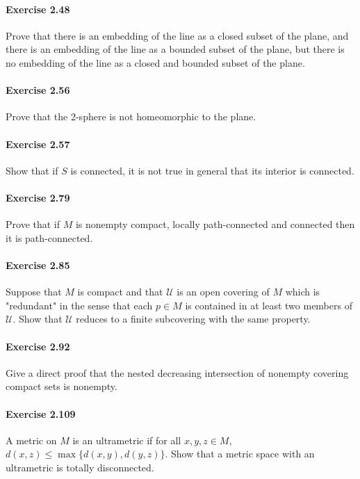 \documentclass{article}
\begin{document}
\paragraph{Exercise 2.48} Prove that there is an embedding of the line as a closed subset of the plane, and there is an embedding of the line as a bounded subset of the plane, but there is no embedding of the line as a closed and bounded subset of the plane.

\paragraph{Exercise 2.56} Prove that the 2-sphere is not homeomorphic to the plane.

\paragraph{Exercise 2.57} Show that if $S$ is connected, it is not true in general that its interior is connected.

\paragraph{Exercise 2.79} Prove that if $M$ is nonempty compact, locally path-connected and connected then it is path-connected.

\paragraph{Exercise 2.85} Suppose that $M$ is compact and that $\mathcal{U}$ is an open covering of $M$ which is "redundant" in the sense that each $p \in M$ is contained in at least two members of $\mathcal{U}$. Show that $\mathcal{U}$ reduces to a finite subcovering with the same property.

\paragraph{Exercise 2.92} Give a direct proof that the nested decreasing intersection of nonempty covering compact sets is nonempty.

\paragraph{Exercise 2.109} A metric on $M$ is an ultrametric if for all $x, y, z \in M$, $d(x, z) \leq \max \{d(x, y), d(y, z)\} .$ Show that a metric space with an ultrametric is totally disconnected.
\end{document}
